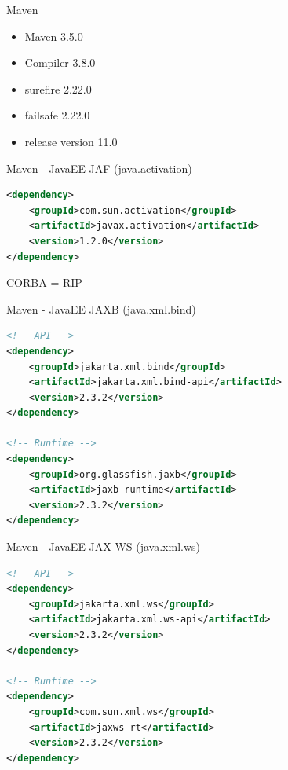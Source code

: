 \documentclass[aspectratio=169]{beamer}
\begin{document}
\begin{frame}[fragile]{Maven}
    \begin{itemize}
        \item Maven 3.5.0
        \item Compiler 3.8.0
        \item surefire 2.22.0
        \item failsafe 2.22.0
        \item release version 11.0
    \end{itemize}
    
\end{frame}

\begin{frame}[fragile]{Maven - JavaEE}
JAF (java.activation)

\begin{lstlisting}[language=xml]
<dependency>
    <groupId>com.sun.activation</groupId>
    <artifactId>javax.activation</artifactId>
    <version>1.2.0</version>
</dependency>
\end{lstlisting}



CORBA = RIP
\end{frame}

\begin{frame}[fragile]{Maven - JavaEE}
JAXB (java.xml.bind)
    
\begin{lstlisting}[language=xml]
<!-- API -->
<dependency>
    <groupId>jakarta.xml.bind</groupId>
    <artifactId>jakarta.xml.bind-api</artifactId>
    <version>2.3.2</version>
</dependency>

<!-- Runtime -->
<dependency>
    <groupId>org.glassfish.jaxb</groupId>
    <artifactId>jaxb-runtime</artifactId>
    <version>2.3.2</version>
</dependency>
\end{lstlisting}
\end{frame}

\begin{frame}[fragile]{Maven - JavaEE}
    JAX-WS (java.xml.ws)
    
\begin{lstlisting}[language=xml]
<!-- API -->
<dependency>
    <groupId>jakarta.xml.ws</groupId>
    <artifactId>jakarta.xml.ws-api</artifactId>
    <version>2.3.2</version>
</dependency>

<!-- Runtime -->
<dependency>
    <groupId>com.sun.xml.ws</groupId>
    <artifactId>jaxws-rt</artifactId>
    <version>2.3.2</version>
</dependency>
\end{lstlisting}
\end{frame}
\end{document}

